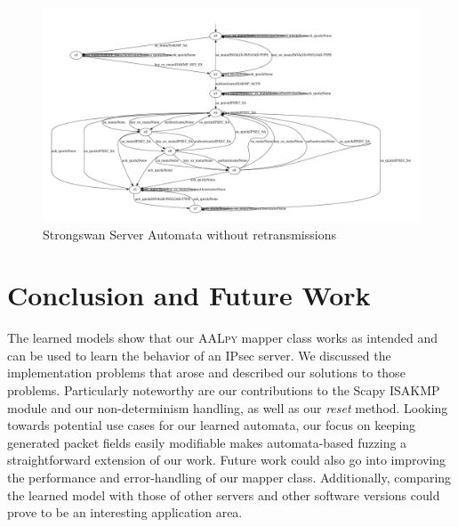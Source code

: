 \documentclass[runningheads]{llncs}
\begin{document}
\begin{figure}[!h]
	\centering
	\includegraphics[width=1\linewidth]{LearnedModel}
	\caption[Learned Model]{Strongswan Server Automata without retransmissions}
	\label{fig:learnedmodel}
\end{figure}

\section{Conclusion and Future Work} \label{chap:6} %
The learned models show that our \textsc{AALpy} mapper class works as intended and can be used to learn the behavior of an IPsec server. We discussed the implementation problems that arose and described our solutions to those problems. Particularly noteworthy are our contributions to the Scapy ISAKMP module and our non-determinism handling, as well as our \emph{reset} method. Looking towards potential use cases for our learned automata, our focus on keeping generated packet fields easily modifiable makes automata-based fuzzing a straightforward extension of our work. Future work could also go into improving the performance and error-handling of our mapper class. Additionally, comparing the learned model with those of other servers and other software versions could prove to be an interesting application area. \pagebreak


%
%
%


\end{document}
